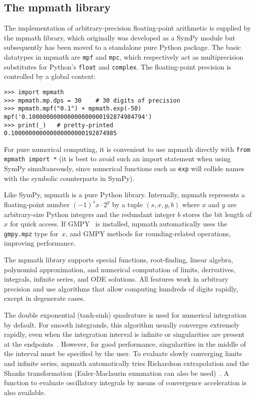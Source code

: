 \subsection{The mpmath library}

The implementation of arbitrary-precision floating-point arithmetic is
supplied by the mpmath library, which originally was developed as a SymPy
module but subsequently has been moved to a standalone pure Python package.
The basic datatypes in mpmath are \texttt{mpf} and \texttt{mpc}, which
respectively act as multiprecision substitutes for Python's \texttt{float} and
\texttt{complex}. The floating-point precision is controlled by a global
context:

\begin{verbatim}
>>> import mpmath
>>> mpmath.mp.dps = 30    # 30 digits of precision
>>> mpmath.mpf("0.1") + mpmath.exp(-50)
mpf('0.100000000000000000000192874984794')
>>> print(_)   # pretty-printed
0.100000000000000000000192874985
\end{verbatim}

For pure numerical computing, it is convenient to use mpmath directly
with \texttt{from mpmath import *} (it is best to avoid such an
import statement when using SymPy simultaneously, since numerical
functions such as \texttt{exp} will collide names with the symbolic counterparts
in SymPy).

Like SymPy, mpmath is a pure Python library.
Internally, mpmath represents a floating-point number
${(-1)}^s x \cdot 2^y$ by a tuple $(s, x, y, b)$ where
$x$ and $y$ are arbitrary-size Python integers
and the redundant integer $b$ stores the bit length of $x$ for quick access.
If GMPY~\cite{GMPY} is installed, mpmath automatically uses
the \texttt{gmpy.mpz} type for~$x$, and GMPY methods
for rounding-related operations, improving performance.

The mpmath library supports
special functions, root-finding, linear algebra, polynomial approximation,
and numerical computation of limits, derivatives, integrals, infinite
series, and ODE solutions. All features work in arbitrary precision
and use algorithms that allow computing hundreds of digits rapidly,
except in degenerate cases.

The double exponential (tanh-sinh) quadrature is used for numerical
integration by default. For smooth integrands, this algorithm usually
converges extremely rapidly, even when the integration interval is infinite
or singularities are present at the endpoints~\cite{takahasi1974double,bailey2005comparison}.
However, for good performance, singularities
in the middle of the interval must be specified
by the user.
To evaluate slowly converging limits and infinite series, mpmath
automatically tries Richardson extrapolation and the
Shanks transformation
(Euler-Maclaurin summation can also be used)~\cite{BenderOrszag1999}.
A function to evaluate oscillatory integrals by means of convergence
acceleration is also available.

